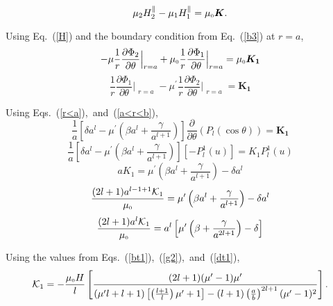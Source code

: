 \begin{equation}\label{b3}   
\mu_2 H_2^\parallel - \mu_1 H_1^\parallel =\mu_{\scriptscriptstyle 0} \bm{K}{\rm .} 
\end{equation}

Using Eq.~(\ref{H}) and the boundary condition from Eq.~(\ref{b3}) at $r=a$,
$$-\mu\frac{1}{r}\frac{\partial \Phi_2}{\partial \theta}\Bigr|_{\substack{r=a}}+\mu_{\scriptscriptstyle 0} \frac{1}{r}\frac{\partial \Phi_1}{\partial \theta}\Bigr|_{\substack{r=a}}=\mu_{\scriptscriptstyle 0}\bm{K_1} $$
$$\frac{1}{r}\frac{\partial \Phi_1}{\partial \theta}\Bigr|_{\substack{r=a}}-\mu^{\prime}\frac{1}{r}\frac{\partial \Phi_2}{\partial \theta}\Bigr|_{\substack{r=a}}=\bm{K_1} $$

Using Eqs.~(\ref{r<a}),~and~(\ref{a<r<b}),
$$\frac{1}{a}\left[\delta a^l-\mu^{\prime}\left(\beta a^l+\frac{\gamma}{a^{l+1}}\right)\right]\frac{\partial}{\partial \theta}(P_l(\cos\theta))= \bm{K_1}$$
$$\frac{1}{a}\left[\delta a^l-\mu^{\prime} \left(\beta a^l+\frac{\gamma}{a^{l+1}}\right)\right][-P_l^1(u)]= K_1 P_l^1(u)$$
$$a K_1=\mu^{\prime}\left(\beta a^l+\frac{\gamma}{a^{l+1}}\right)-\delta a^l$$
$$\frac{(2l+1)a^{l-1+1}\mathcal{K}_1}{\mu_{\scriptscriptstyle 0}}=\mu^{\prime}\left(\beta a^l+\frac{\gamma}{a^{l+1}}\right)-\delta a^l$$
$$\frac{(2l+1)a^l\mathcal{K}_1}{\mu_{\scriptscriptstyle 0}}=a^l\left[\mu^{\prime}\left(\beta +\frac{\gamma}{a^{2l+1}}\right)-\delta \right]$$

Using the values from Eqs.~(\ref{bt1}),~(\ref{g2}),~and~(\ref{dt1}),
\begin{equation}\label{k1s}
\mathcal{K}_1=-\frac{\mu_{\scriptscriptstyle 0} H}{l}\left[\frac{(2l+1)(\mu'-1)\mu'}{(\mu'l+l+1)\left[\left(\frac{l+1}{l}\right)\mu'+1\right]-(l+1)\left(\frac{a}{b}\right)^{2l+1}(\mu'-1)^2}\right]{\rm .}
\end{equation}

